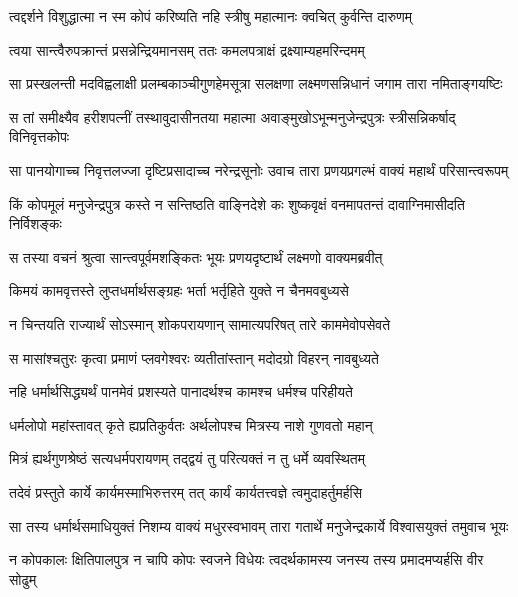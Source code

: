 \twolineshloka
{त्वद्दर्शने विशुद्धात्मा न स्म कोपं करिष्यति}
{नहि स्त्रीषु महात्मानः क्वचित् कुर्वन्ति दारुणम्} %

\twolineshloka
{त्वया सान्त्वैरुपक्रान्तं प्रसन्नेन्द्रियमानसम्}
{ततः कमलपत्राक्षं द्रक्ष्याम्यहमरिन्दमम्} %

\twolineshloka
{सा प्रस्खलन्ती मदविह्वलाक्षी प्रलम्बकाञ्चीगुणहेमसूत्रा}
{सलक्षणा लक्ष्मणसन्निधानं जगाम तारा नमिताङ्गयष्टिः} %

\twolineshloka
{स तां समीक्ष्यैव हरीशपत्नीं तस्थावुदासीनतया महात्मा}
{अवाङ्मुखोऽभून्मनुजेन्द्रपुत्रः स्त्रीसन्निकर्षाद् विनिवृत्तकोपः} %

\twolineshloka
{सा पानयोगाच्च निवृत्तलज्जा दृष्टिप्रसादाच्च नरेन्द्रसूनोः}
{उवाच तारा प्रणयप्रगल्भं वाक्यं महार्थं परिसान्त्वरूपम्} %

\twolineshloka
{किं कोपमूलं मनुजेन्द्रपुत्र कस्ते न सन्तिष्ठति वाङ्निदेशे}
{कः शुष्कवृक्षं वनमापतन्तं दावाग्निमासीदति निर्विशङ्कः} %

\twolineshloka
{स तस्या वचनं श्रुत्वा सान्त्वपूर्वमशङ्कितः}
{भूयः प्रणयदृष्टार्थं लक्ष्मणो वाक्यमब्रवीत्} %

\twolineshloka
{किमयं कामवृत्तस्ते लुप्तधर्मार्थसङ्ग्रहः}
{भर्ता भर्तृहिते युक्ते न चैनमवबुध्यसे} %

\twolineshloka
{न चिन्तयति राज्यार्थं सोऽस्मान् शोकपरायणान्}
{सामात्यपरिषत् तारे काममेवोपसेवते} %

\twolineshloka
{स मासांश्चतुरः कृत्वा प्रमाणं प्लवगेश्वरः}
{व्यतीतांस्तान् मदोदग्रो विहरन् नावबुध्यते} %

\twolineshloka
{नहि धर्मार्थसिद्ध्यर्थं पानमेवं प्रशस्यते}
{पानादर्थश्च कामश्च धर्मश्च परिहीयते} %

\twolineshloka
{धर्मलोपो महांस्तावत् कृते ह्यप्रतिकुर्वतः}
{अर्थलोपश्च मित्रस्य नाशे गुणवतो महान्} %

\twolineshloka
{मित्रं ह्यर्थगुणश्रेष्ठं सत्यधर्मपरायणम्}
{तद्द्वयं तु परित्यक्तं न तु धर्मे व्यवस्थितम्} %

\twolineshloka
{तदेवं प्रस्तुते कार्ये कार्यमस्माभिरुत्तरम्}
{तत् कार्यं कार्यतत्त्वज्ञे त्वमुदाहर्तुमर्हसि} %

\twolineshloka
{सा तस्य धर्मार्थसमाधियुक्तं निशम्य वाक्यं मधुरस्वभावम्}
{तारा गतार्थे मनुजेन्द्रकार्ये विश्वासयुक्तं तमुवाच भूयः} %

\twolineshloka
{न कोपकालः क्षितिपालपुत्र न चापि कोपः स्वजने विधेयः}
{त्वदर्थकामस्य जनस्य तस्य प्रमादमप्यर्हसि वीर सोढुम्} %

